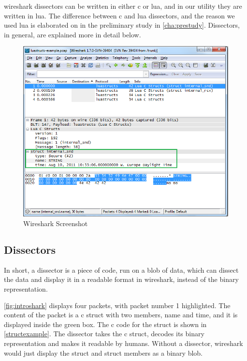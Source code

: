 \Gls{wireshark} \glspl{dissector} can be written in either \Gls{c} or \Gls{lua}, and in our \gls{utility} they are written in \Gls{lua}.
The difference between \Gls{c} and \Gls{lua} \glspl{dissector},
and the reason we used \Gls{lua} is elaborated on in the 
preliminary study in \autoref{cha:prestudy}.
Dissectors, in general, are explained more in detail below.

\begin{figure}[htb]
	\includegraphics[width=\textwidth]{./img/wireshark_example.png}
	\caption{Wireshark Screenshot\label{fig:introshark}}
\end{figure}

\subsection{Dissectors}
In short, a \gls{dissector} is a piece of code, run on a blob of data, which can dissect the
data and display it in a readable format in \Gls{wireshark}, instead of the \gls{binary} representation.

\autoref{fig:introshark} displays four \glspl{packet}, with \gls{packet} number 1 highlighted.
The content of the \gls{packet} is a \Gls{c} \gls{struct} with two \glspl{member}, name and time, and it is displayed inside the green box.
The \Gls{c} code for the \gls{struct} is shown in \autoref{structexample}.
The \gls{dissector} takes the \Gls{c} \gls{struct}, decodes its \gls{binary} representation and makes it readable by humans.
Without a \gls{dissector}, \Gls{wireshark} would just display the \gls{struct} and \gls{struct} \glspl{member} as a \gls{binary} blob.

